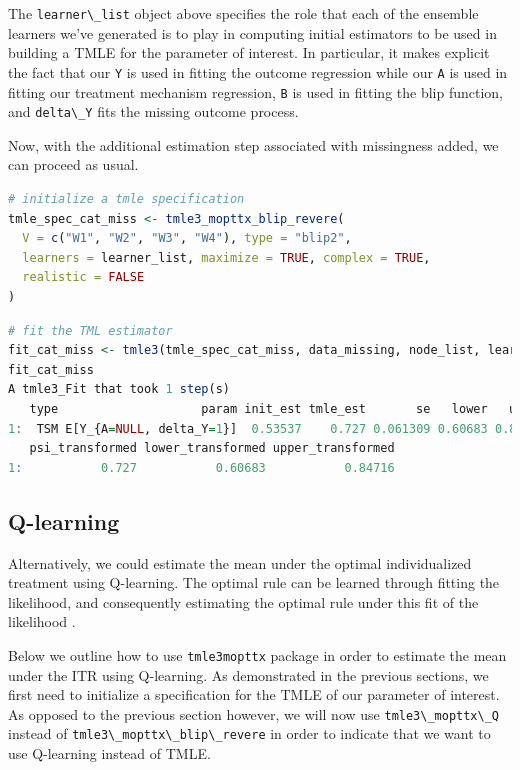 \documentclass[
  12pt, krantz2,
]{krantz}
\newcommand{\passthrough}[1]{#1}
\theoremstyle{definition}
\theoremstyle{definition}
\theoremstyle{definition}
\newcommand{\1}{\mathbbm{1}}
\begin{document}
The \passthrough{\lstinline!learner\_list!} object above specifies the role that each of the ensemble
learners we've generated is to play in computing initial estimators to be used
in building a TMLE for the parameter of interest. In particular, it makes
explicit the fact that our \passthrough{\lstinline!Y!} is used in fitting the outcome regression
while our \passthrough{\lstinline!A!} is used in fitting our treatment mechanism regression,
\passthrough{\lstinline!B!} is used in fitting the blip function, and \passthrough{\lstinline!delta\_Y!} fits the missing outcome process.

Now, with the additional estimation step associated with missingness added, we can proceed
as usual.

\begin{lstlisting}[language=R]
# initialize a tmle specification
tmle_spec_cat_miss <- tmle3_mopttx_blip_revere(
  V = c("W1", "W2", "W3", "W4"), type = "blip2",
  learners = learner_list, maximize = TRUE, complex = TRUE,
  realistic = FALSE
)
\end{lstlisting}

\begin{lstlisting}[language=R]
# fit the TML estimator
fit_cat_miss <- tmle3(tmle_spec_cat_miss, data_missing, node_list, learner_list)
fit_cat_miss
A tmle3_Fit that took 1 step(s)
   type                    param init_est tmle_est       se   lower   upper
1:  TSM E[Y_{A=NULL, delta_Y=1}]  0.53537    0.727 0.061309 0.60683 0.84716
   psi_transformed lower_transformed upper_transformed
1:           0.727           0.60683           0.84716
\end{lstlisting}

\hypertarget{q-learning}{%
\subsection{Q-learning}\label{q-learning}}

Alternatively, we could estimate the mean under the optimal individualized
treatment using Q-learning. The optimal rule can be learned through fitting the
likelihood, and consequently estimating the optimal rule under this fit of the
likelihood \citep{Sutton1998, murphy2003}.

Below we outline how to use \passthrough{\lstinline!tmle3mopttx!} package in order to estimate the mean
under the ITR using Q-learning. As demonstrated in the previous sections, we
first need to initialize a specification for the TMLE of our parameter of
interest. As opposed to the previous section however, we will now use
\passthrough{\lstinline!tmle3\_mopttx\_Q!} instead of \passthrough{\lstinline!tmle3\_mopttx\_blip\_revere!} in order to indicate that
we want to use Q-learning instead of TMLE.
\end{document}
